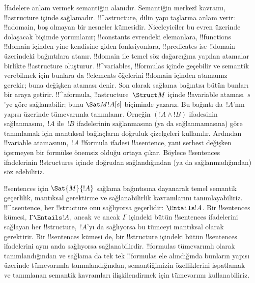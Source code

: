 \documentclass[../../../include/open-logic-section]{subfiles}
\begin{document}


İfadelere anlam vermek semantiğin alanıdır. Semantiğin merkezî kavramı,
!!a{structure} içinde sağlamadır. !!^a{structure}, dilin yapı taşlarına
anlam verir: !!a{domain}, boş olmayan bir nesneler kümesidir.
Niceleyiciler bu evren üzerinde dolaşacak biçimde yorumlanır;
!!{constant}s evrendeki elemanlara, !!{function}s !!{domain} içinden
yine kendisine giden fonksiyonlara, !!{predicate}s ise !!{domain}
üzerindeki bağıntılara atanır. !!{domain} ile temel söz dağarcığına
yapılan atamalar birlikte !!a{structure} oluşturur. !!^{variable}s,
!!{formula}s içinde geçebilir ve semantik verebilmek için bunlara da
!!{element}s öğelerini !!{domain} içinden atamamız gerekir; buna
değişken ataması denir. Son olarak sağlama bağıntısı bütün bunları bir
araya getirir. !!^a{formula}, !!a{structure}~$\Struct M$ içinde
!!a{variable} ataması~$s$'ye göre sağlanabilir; bunu
$\Sat M{!A}[s]$ biçiminde yazarız. Bu bağıntı da~$!A$'nın yapısı
üzerinde tümevarımla tanımlanır. Örneğin $(!A\land !B)$ ifadesinin
sağlanmasını,~$!A$ ile~$!B$ ifadelerinin sağlanmasına (ya da
sağlanmamasına) göre tanımlamak için mantıksal bağlaçların doğruluk
çizelgeleri kullanılır. Ardından !!{variable} atamasının,~$!A$
!!{formula} ifadesi !!a{sentence}, yani serbest değişken içermeyen bir
formülse önemsiz olduğu ortaya çıkar. Böylece
!!{sentence}s ifadelerinin !!{structure}s içinde doğrudan sağlandığından
(ya da sağlanmadığından) söz edebiliriz.

!!{sentence}s için $\Sat{M}{!A}$ sağlama bağıntısına dayanarak temel
semantik geçerlilik, mantıksal gerektirme ve sağlanabilirlik
kavramlarını tanımlayabiliriz. !!^a{sentence}, her !!{structure} onu
sağlıyorsa geçerlidir: $\Entails !A$. Bir !!{sentence}s kümesi,
$\Gamma \Entails !A$, ancak ve ancak $\Gamma$ içindeki bütün
!!{sentence}s ifadelerini sağlayan her !!{structure},~$!A$'yı da
sağlıyorsa bu tümceyi mantıksal olarak gerektirir. Bir
!!{sentence}s kümesi de, bir !!{structure} içindeki bütün
!!{sentence}s ifadelerini aynı anda sağlıyorsa sağlanabilirdir.
!!{formula}s tümevarımlı olarak tanımlandığından ve sağlama da tek tek
!!{formula}s ele alındığında bunların yapısı üzerinde tümevarımla
tanımlandığından, semantiğimizin özelliklerini ispatlamak ve tanımlanan
semantik kavramları ilişkilendirmek için tümevarımı kullanabiliriz.
\end{document}
